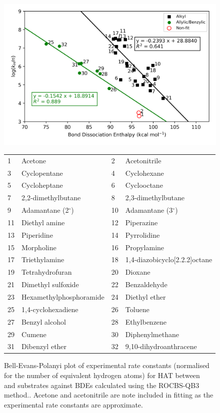 \begin{figure}[!htbp]
  \centering
  \includegraphics[width=\textwidth]{figures/bde-bep}
\begin{tabularx}{\textwidth}{| l X l X |}
  \hline
  1 & Acetone & 2 & Acetonitrile \\
  3 & Cyclopentane & 4 & Cyclohexane \\
  5 & Cycloheptane & 6 & Cyclooctane \\
  7 & 2,2-dimethylbutane & 8 & 2,3-dimethylbutane \\
  9 & Adamantane (2$^\circ$) & 10 & Adamantane (3$^\circ$) \\
  11 & Diethyl amine & 12 & Piperazine \\
  13 & Piperidine & 14 & Pyrrolidine \\
  15 & Morpholine & 16 & Propylamine \\
  17 & Triethylamine & 18 & 1,4-diazobicyclo[2.2.2]octane \\
  19 & Tetrahydrofuran & 20 & Dioxane \\
  21 & Dimethyl sulfoxide & 22 & Benzaldehyde \\
  23 & Hexamethylphosphoramide & 24 & Diethyl ether \\
  25 & 1,4-cyclohexadiene & 26 & Toluene \\
  27 & Benzyl alcohol & 28 & Ethylbenzene \\
  29 & Cumene & 30 & Diphenylmethane \\
  31 & Dibenzyl ether & 32 & 9,10-dihydroanthracene \\
  \hline
\end{tabularx}
  \caption[Bell-Evans-Polanyi plot of experimental rate constants (normalised for the number of equivalent hydrogen atoms) for HAT between \cumo~ and substrates against BDEs calculated using the ROCBS-QB3 method.]{Bell-Evans-Polanyi plot of experimental rate constants (normalised for the number of equivalent hydrogen atoms) for HAT between \cumo~ and substrates against BDEs calculated using the ROCBS-QB3 method.. Acetone and acetonitrile are note included in fitting as the experimental rate constants are approximate.}
\label{fig:bde-bep}
\end{figure}


